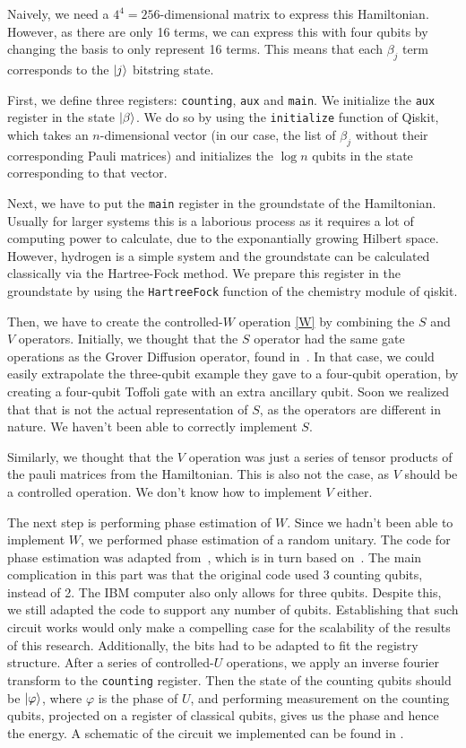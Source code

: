 \documentclass{article}
\begin{document}
Naively, we need a $4^4 = 256$-dimensional matrix to express this Hamiltonian. However, as there are only 16 terms, we can express this with four qubits by changing the basis to only represent 16 terms.  This means that each $\beta_j$ term corresponds to the $\ket{j}$ bitstring state.

First, we define three registers:  \verb|counting|, \verb|aux| and \verb|main|. We initialize the \verb|aux| register in the state $\ket{\beta}$. We do so by using the \verb|initialize| function of Qiskit, which takes an $n$-dimensional vector (in our case, the list of $\beta_j$ without their corresponding Pauli matrices) and initializes the $\log{n}$  qubits in the state corresponding to that vector.

Next, we have to put the \verb|main| register in the groundstate of the Hamiltonian. Usually for larger systems this is a laborious process as it requires a lot of computing power to calculate, due to the exponantially growing Hilbert space. However, hydrogen is a simple system and the groundstate can be  calculated classically via the Hartree-Fock method. We prepare this register in the groundstate by using the \verb|HartreeFock| function of the chemistry module of qiskit.

Then, we have to create the controlled-$W$ operation \cref{W} by combining the $S$ and $V$ operators. Initially, we thought that the $S$ operator had the same gate operations as the Grover Diffusion operator, found in~\cite{Qiskit-Textbook}. In that case, we could easily extrapolate the three-qubit example they gave to a four-qubit operation, by creating a four-qubit Toffoli gate with an extra ancillary qubit. Soon we realized that that is not the actual representation of $S$, as the operators are different in nature. We haven't been able to correctly implement $S$.

Similarly, we thought that the $V$ operation was just a series of tensor products of the pauli matrices from the Hamiltonian. This is also not the case, as $V$ should be a controlled operation. We don't know how to implement $V$ either.

The next step is performing phase estimation of $W$. Since we hadn't
been able to implement $W$, we performed phase estimation of a random
unitary. The code for phase estimation was adapted
from~\cite{Qiskit-Textbook}, which is in turn based
on~\textcite{nielsen}. The main complication in this part was that the
original code used 3 counting qubits, instead of 2. The IBM computer also
only allows for three qubits. Despite this, we still adapted the code
to support any number of qubits. Establishing that such circuit works
would only make a compelling case for the scalability of the results
of this research. Additionally, the bits had
to be adapted to fit the registry structure. After a series of
controlled-$U$ operations, we apply an inverse fourier transform to
the \verb|counting| register. Then the state of the counting qubits
should be $\ket{\varphi}$, where $\varphi$ is the phase of $U$, and performing measurement on the counting qubits, projected on a register of classical qubits, gives us the phase and hence the energy. A schematic of the circuit we implemented can be found in .
\end{document}
